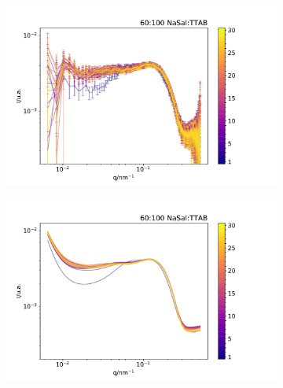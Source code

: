 \begin{figure}[h]
    \begin{subfigure}[t]{0.5\textwidth}
        \centering
        \includegraphics[width=\textwidth]{imagens/saxs/TR_saxs_60_100_15_dados.pdf}
        \caption{}
        \label{fig:saxs_tr_}
    \end{subfigure}%
    \begin{subfigure}[t]{0.5\textwidth}
        \centering
        \includegraphics[width=\textwidth]{imagens/saxs/TR_saxs_60_100_15_ajustes.pdf}
        \caption{}
        \label{fig:saxs_tr_}
    \end{subfigure}
    \caption{}
    \label{fig:}
\end{figure} 

